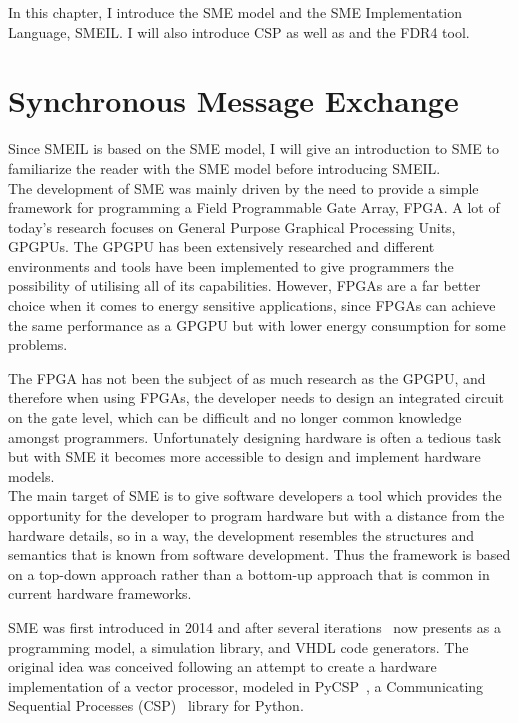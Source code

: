 In this chapter, I introduce the SME model and the SME Implementation Language, SMEIL. I will also introduce CSP as well as \cspm{} and the FDR4 tool.

\section{Synchronous Message Exchange}
Since SMEIL is based on the SME model, I will give an introduction to SME to familiarize the reader with the SME model before introducing SMEIL.
\\

The development of SME was mainly driven by the need to provide a simple framework for programming a Field Programmable Gate
Array, FPGA. A lot of today's research focuses on General Purpose Graphical Processing Units, GPGPUs. The GPGPU has been extensively researched and different environments and tools have been implemented to give programmers the possibility of utilising all of its capabilities. However, FPGAs are a far better choice when it comes to energy sensitive applications, since FPGAs can achieve the same performance as a GPGPU but with lower energy consumption for some problems.

The FPGA has not been the subject of as much research as the GPGPU, and therefore when using FPGAs, the developer needs to design an integrated circuit on the gate level, which can be difficult and no longer common knowledge amongst programmers.
Unfortunately designing hardware is often a tedious task but with SME it becomes more accessible to design and implement hardware models.\\

The main target of SME is to give software developers a tool which provides the opportunity for the developer to program hardware but with a distance from the hardware details, so in a way, the development resembles the structures and semantics that is known from software development.
Thus the framework is based on a top-down approach rather than a bottom-up approach that is common in current hardware frameworks.

SME was first introduced in 2014 and after several iterations~\cite{Vinter2014, Vinter2015, Skovhede} now presents as a programming model, a simulation library, and VHDL code generators. The original idea was conceived following an attempt to create a hardware implementation of a vector processor, modeled in PyCSP~\cite{bjorndalen2007pycsp, vinter2009pycsp},
a Communicating Sequential Processes (CSP)~\cite{Hoare1978} library for Python.\\

